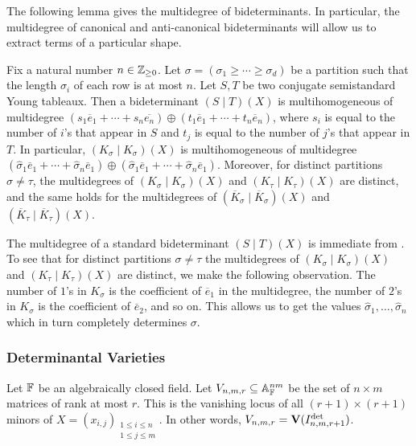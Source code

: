 \documentclass[letterpaper, 11pt]{amsart}
\newif\iffull
\begin{document}
The following lemma gives the multidegree of bideterminants.
In particular, the multidegree of canonical and anti-canonical bideterminants will allow us to extract terms of a particular shape.
\begin{lem}\label{lem:canonical_degs}
    Fix a natural number $n \in \mathbb{Z}_{\geq 0}$.
    Let $\sigma = (\sigma_1 \geq \cdots \geq \sigma_d)$ be a partition such that the length $\sigma_i$ of each row is at most $n$.
    Let $S, T$ be two conjugate semistandard Young tableaux.
    Then a bideterminant $(S \mid T)(X)$ is multihomogeneous of multidegree $(s_1 \overline{e}_1 + \cdots + s_n \overline{e_n}) \oplus (t_1 \overline{e}_1 + \cdots + t_n \overline{e}_n)$, where $s_i$ is equal to the number of $i$'s that appear in $S$ and $t_j$ is equal to the number of $j$'s that appear in $T$.
    In particular, $(K_\sigma \mid K_\sigma)(X)$ is multihomogeneous of multidegree $(\widehat{\sigma}_1 \overline{e}_1 + \cdots + \widehat{\sigma}_n \overline{e}_1) \oplus (\widehat{\sigma}_1 \overline{e}_1 + \cdots + \widehat{\sigma}_n \overline{e}_1)$.
    Moreover, for distinct partitions $\sigma \neq \tau$, the multidegrees of $(K_\sigma \mid K_\sigma)(X)$ and $(K_\tau \mid K_\tau)(X)$ are distinct, and the same holds for the multidegrees of $(\overline{K}_\sigma \mid \overline{K}_\sigma)(X)$ and $(\overline{K}_\tau \mid \overline{K}_\tau)(X)$.
\end{lem}
\begin{pf}
    The multidegree of a standard bideterminant $(S \mid T)(X)$ is immediate from .
    To see that for distinct partitions $\sigma \neq \tau$ the multidegrees of $(K_\sigma \mid K_\sigma)(X)$ and $(K_\tau \mid K_\tau)(X)$ are distinct, we make the following observation.
    The number of $1$'s in $K_{\sigma}$ is the coefficient of $\overline{e}_1$ in the multidegree, the number of $2$'s in $K_{\sigma}$ is the coefficient of $\overline{e}_2$, and so on.
    This allows us to get the values $\widehat{\sigma}_1, \ldots, \widehat{\sigma}_n$ which in turn completely determines $\sigma$.
\end{pf}
\fi

\iffull
\clearpage
\fi

\iffull
\subsubsection{Determinantal Varieties}

\begin{defn}
  Let $\mathbb{F}$ be an algebraically closed field.
  Let $V_{n, m, r} \subseteq \mathbb{A}_{\mathbb{F}}^{nm}$ be the set of $n \times m$ matrices of rank at most $r$.
  This is the vanishing locus of all $(r + 1) \times (r + 1)$ minors of $X = (x_{i, j})_{\substack{1 \leq i \leq n \\ 1 \leq j \leq m}}$.
  In other words, $V_{n, m, r} = \operatorname{\mathbf{V}}(I^{\det}_{n, m, r + 1})$.
\end{defn}
\end{document}
